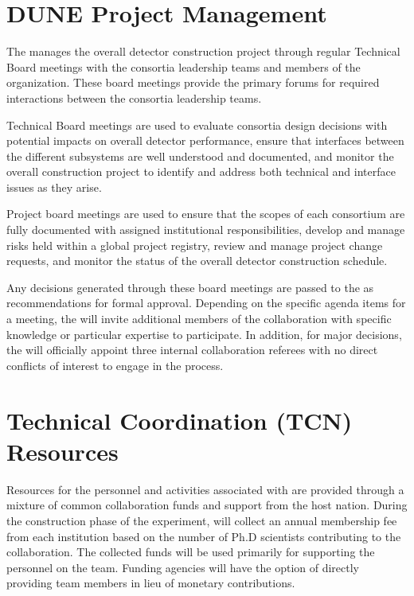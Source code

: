 \section{DUNE Project Management}
\label{sec:pm}


The  manages the overall detector construction project
through regular Technical Board meetings with the consortia leadership
teams and members of the  organization.  These board
meetings provide the primary forums for required interactions between
the consortia leadership teams.

Technical Board meetings are used to evaluate consortia design
decisions with potential impacts on overall detector performance,
ensure that interfaces between the different subsystems are well
understood and documented, and monitor the overall construction
project to identify and address both technical and interface issues as
they arise.

Project board meetings are used to ensure that the scopes of each
consortium are fully documented with assigned institutional
responsibilities, develop and manage risks held within a global
project registry, review and manage project change requests, and
monitor the status of the overall detector construction schedule.

Any decisions generated through these board meetings are passed to the
  as recommendations for formal approval.
Depending on the specific agenda items for a meeting, the
 will invite additional members of the collaboration
with specific knowledge or particular expertise to participate.  In
addition, for major decisions, the  will officially
appoint three internal collaboration referees with no direct conflicts
of interest to engage in the process.

\section{Technical Coordination (TCN) Resources}
\label{sec:tc_resources}

Resources for the personnel and activities associated with 
are provided through a mixture of common collaboration funds and
support from the host nation.  During the construction phase of the
experiment,  will collect an annual membership fee from
each institution based on the number of Ph.D scientists contributing
to the collaboration.  The collected funds will be used primarily for
supporting the personnel on the  team.  Funding agencies
will have the option of directly providing team members in lieu of
monetary contributions.

